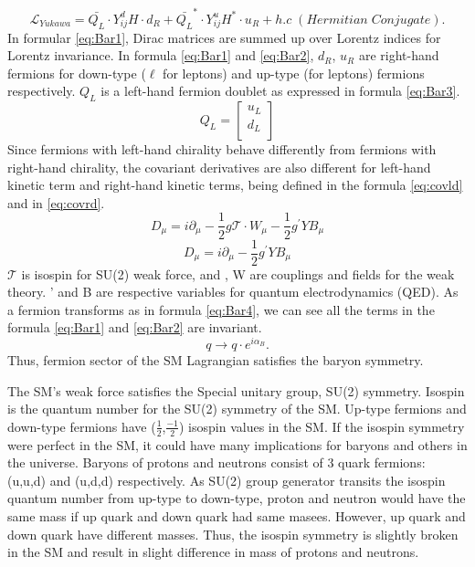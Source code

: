 \begin{equation}
\label{eq:Bar2}
	\mathcal{L}_{Yukawa}  = \bar{Q_{L}}\cdot Y^{d}_{ij}H\cdot d_{R}+\bar{Q_{L}}^{*}\cdot Y^{u}_{ij}H^{*}\cdot u_{R}+h.c\;(Hermitian\;Conjugate).
\end{equation}
In formular \ref{eq:Bar1}, Dirac matrices are summed up over Lorentz indices for Lorentz invariance. 
In formula \ref{eq:Bar1} and \ref{eq:Bar2}, $d_{R}$, $u_{R}$ are right-hand fermions for down-type ($\ell$ for leptons) and up-type (\PGnl for leptons) fermions respectively.
$Q_{L}$ is a left-hand fermion doublet as expressed in formula \ref{eq:Bar3}.
\begin{equation}
\label{eq:Bar3}
	Q_{L}=\begin{bmatrix}
	u_L \\
	d_L \\
\end{bmatrix}
\end{equation}
Since fermions with left-hand chirality behave differently from fermions with right-hand chirality,
the covariant derivatives are also different for left-hand kinetic term and right-hand kinetic terms, being defined in the formula \ref{eq:covld} and in \ref{eq:covrd}.
\begin{equation}
\label{eq:covld}
	D_{\mu}  = i\partial_{\mu}-\frac{1}{2}g\mathcal{T}\cdot W_{\mu}-\frac{1}{2}g^{'}YB_{\mu} 
\end{equation}
\begin{equation}
\label{eq:covrd}
	D_{\mu}  = i\partial_{\mu}-\frac{1}{2}g^{'}YB_{\mu} 
\end{equation}
$\mathcal{T}$ is isospin for SU(2) weak force, and \Pg, W are couplings and fields for the weak theory. \Pg' and B are respective variables for quantum electrodynamics (QED).
As a fermion transforms as in formula \ref{eq:Bar4}, we can see all the terms in the formula \ref{eq:Bar1} and \ref{eq:Bar2} are invariant. 
\begin{equation}
\label{eq:Bar4}
	q \to q\cdot e^{i\alpha_{B}} .
\end{equation}
Thus, fermion sector of the SM Lagrangian satisfies the baryon symmetry. 


The SM's weak force satisfies the Special unitary group, SU(2) symmetry.
Isospin is the quantum number for the SU(2) symmetry of the SM.
Up-type fermions and down-type fermions have ($\frac{1}{2}$,$\frac{-1}{2}$) isospin values in the SM.
If the isospin symmetry were perfect in the SM, it could have many implications for baryons and others in the universe.
Baryons of protons and neutrons consist of 3 quark fermions: (u,u,d) and (u,d,d) respectively.
As SU(2) group generator transits the isospin quantum number from up-type to down-type, proton and neutron would have the same mass if up quark and down quark had same masees.
However, up quark and down quark have different masses.
Thus, the isospin symmetry is slightly broken in the SM and result in slight difference in mass of protons and neutrons.

